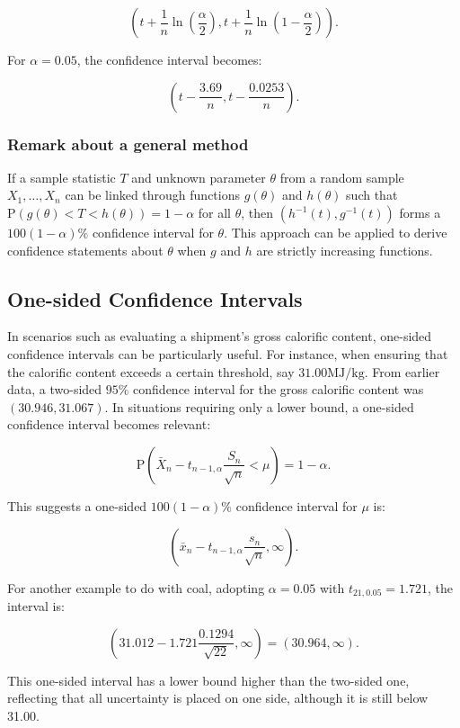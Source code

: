 \documentclass{article}
\begin{document}
\[
\left(t + \frac{1}{n} \ln \left(\frac{\alpha}{2}\right), t + \frac{1}{n} \ln \left(1 - \frac{\alpha}{2}\right)\right).
\]

For $\alpha = 0.05$, the confidence interval becomes:

\[
\left(t - \frac{3.69}{n}, t - \frac{0.0253}{n}\right).
\]


\subsubsection*{Remark about a general method}

If a sample statistic $T$ and unknown parameter $\theta$ from a random sample $X_{1}, \ldots, X_{n}$ can be linked through functions $g(\theta)$ and $h(\theta)$ such that $\mathrm{P}(g(\theta) < T < h(\theta)) = 1-\alpha$ for all $\theta$, then $\left(h^{-1}(t), g^{-1}(t)\right)$ forms a $100(1-\alpha)\%$ confidence interval for $\theta$. This approach can be applied to derive confidence statements about $\theta$ when $g$ and $h$ are strictly increasing functions.

\subsection{One-sided Confidence Intervals}

In scenarios such as evaluating a shipment's gross calorific content, one-sided confidence intervals can be particularly useful. For instance, when ensuring that the calorific content exceeds a certain threshold, say $31.00 \mathrm{MJ}/\mathrm{kg}$. From earlier data, a two-sided $95\%$ confidence interval for the gross calorific content was $(30.946,31.067)$. In situations requiring only a lower bound, a one-sided confidence interval becomes relevant:

\[
\mathrm{P}\left(\bar{X}_{n}-t_{n-1, \alpha} \frac{S_{n}}{\sqrt{n}} < \mu \right) = 1 - \alpha.
\]

This suggests a one-sided $100(1-\alpha)\%$ confidence interval for $\mu$ is:

\[
\left(\bar{x}_{n}-t_{n-1, \alpha} \frac{s_{n}}{\sqrt{n}}, \infty\right).
\]

For another example to do with coal, adopting $\alpha = 0.05$ with $t_{21,0.05} = 1.721$, the interval is:

\[
\left(31.012-1.721 \frac{0.1294}{\sqrt{22}}, \infty\right) = (30.964, \infty).
\]

This one-sided interval has a lower bound higher than the two-sided one, reflecting that all uncertainty is placed on one side, although it is still below 31.00.
\end{document}
